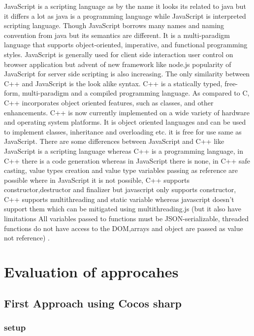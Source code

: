 \documentclass[23pt]{article}
\begin{document}
{\Large JavaScript is a scripting language as by the name it looks its related to java but it differs a lot as java is a programming language while JavaScript is interpreted scripting language. Though JavaScript borrows many names and naming convention from java but its semantics are different. It is a multi-paradigm language that supports object-oriented, imperative, and functional programming styles. JavaScript is generally used for client side interaction user control on browser application but advent of new framework like node.js popularity of JavaScript for server side scripting is also increasing. The only similarity between C++ and JavaScript is the look alike syntax. C++ is a statically typed, free-form, multi-paradigm and a compiled programming language. As compared to C, C++ incorporates object oriented features, such as classes, and other enhancements. C++ is now currently implemented on a wide variety of hardware and operating system platforms. It is object oriented languages and can be used to implement classes, inheritance and overloading etc. it is free for use same as JavaScript. There are some differences between JavaScript and C++ like JavaScript is a scripting language whereas C++ is a programming language, in C++ there is a code generation whereas in JavaScript there is none, in C++ safe casting, value types creation and value type variables passing as reference are possible where in JavaScript it is not possible, C++ supports constructor,destructor and finalizer but javascript only supports constructor, C++ supports multithreading and static variable whereas javascript doesn’t  support them  which can be mitigated using multithreading.js (but it also have limitations All variables passed to functions must be JSON-serializable, threaded functions do not have access to the DOM,arrays and object are passed as value not reference) . \cite{cvsjs1} \cite{cvsjs2} \\ \par}


\section{Evaluation of approcahes}

\subsection{First Approach using Cocos sharp}

\subsubsection{setup}
\end{document}
